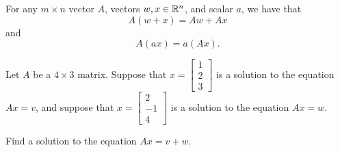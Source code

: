 \endedxproblem


\endedxvertical










For any $m\times n$ vector $A$, vectors $w,x \in \mathbb R^n$, and scalar $a$, we have that 
\[A(w+x) = Aw + Ax\] and
\[A(ax) = a(Ax).\]
  
\endedxtext




Let $A$ be a $4\times 3$ matrix.  Suppose that $x = \left[\begin{array}{c} 1 \\ 2 \\ 3 
\end{array} \right]$ is a solution to the equation $Ax = v$, and suppose that 
$x = \left[\begin{array}{c}  2 \\ -1 \\4
\end{array} \right]$ is a solution to the equation $Ax = w$.  

Find a solution to the equation $Ax = v+w$.  

 




